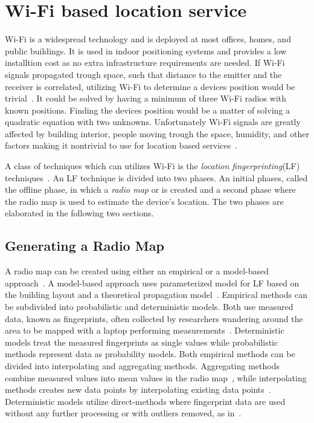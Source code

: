 
\section{Wi-Fi based location service}
Wi-Fi is a widespread technology and is deployed at most offices, homes, and public buildings.
It is used in indoor positioning systems \cite{mlws,5388848,radarlf,Bell2010,6068444} and provides a low installtion cost as no extra infrastructure requirements are needed. 
If Wi-Fi signals propagated trough space, such that distance to the emitter and the receiver is correlated, utilizing Wi-Fi to determine a devices position would be trivial~\cite{ariadne2006}. 
It could be solved by having a minimum of three Wi-Fi radios with known positions. 
Finding the devices position would be a matter of solving a quadratic equation with two unknowns.  
Unfortunately Wi-Fi signals are greatly affected by building interior, people moving trough the space, humidity, and other factors making it nontrivial to use for location based services~\cite{6068444}. 

A class of techniques which can utilizes Wi-Fi is the \textit{location fingerprinting}(LF) techniques~\cite{taxonomy2007}. 
An LF technique is divided into two phases. 
An initial phases, called the offline phase, in which a \textit{radio map} or is created and a second phase where the radio map is used to estimate the device's location.
The two phases are elaborated in the following two sections. 

\subsection{Generating a Radio Map}
A radio map can be created using either an empirical or a model-based approach~\cite{taxonomy2007}. 
A model-based approach uses parameterized model for LF based on the building layout and a theoretical propagation model~\cite{radarlf}.   
Empirical methods can be subdivided into probabilistic and deterministic models.  
Both use measured data, known as fingerprints, often collected by researchers wandering around the area to be mapped with a laptop performing measurements~\cite{roblocal2004,5388848, radarlf}.  
Deterministic models treat the measured fingerprints as single values while probabilistic methods represent data as probability models. 
Both empirical methods can be divided into interpolating and aggregating methods. 
Aggregating methods combine measured values into mean values in the radio map~\cite{radarlf, roblocal2004}, while interpolating methods creates new data points by interpolating existing data points~\cite{locadio2004}. 
Deterministic models utilize direct-methods where fingerprint data are used without any further processing or with outliers removed, as in~\cite{1200692}. 


